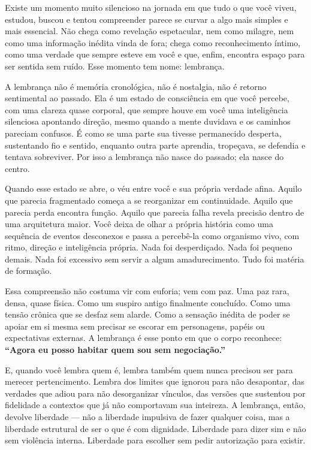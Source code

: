 \documentclass[12pt]{book}
\begin{document}
Existe um momento muito silencioso na jornada em que tudo o que você viveu, estudou, buscou e tentou compreender parece se curvar a algo mais simples e mais essencial. Não chega como revelação espetacular, nem como milagre, nem como uma informação inédita vinda de fora; chega como reconhecimento íntimo, como uma verdade que sempre esteve em você e que, enfim, encontra espaço para ser sentida sem ruído. Esse momento tem nome: lembrança.

A lembrança não é memória cronológica, não é nostalgia, não é retorno sentimental ao passado. Ela é um estado de consciência em que você percebe, com uma clareza quase corporal, que sempre houve em você uma inteligência silenciosa apontando direção, mesmo quando a mente duvidava e os caminhos pareciam confusos. É como se uma parte sua tivesse permanecido desperta, sustentando fio e sentido, enquanto outra parte aprendia, tropeçava, se defendia e tentava sobreviver. Por isso a lembrança não nasce do passado; ela nasce do centro.

Quando esse estado se abre, o véu entre você e sua própria verdade afina. Aquilo que parecia fragmentado começa a se reorganizar em continuidade. Aquilo que parecia perda encontra função. Aquilo que parecia falha revela precisão dentro de uma arquitetura maior. Você deixa de olhar a própria história como uma sequência de eventos desconexos e passa a percebê-la como organismo vivo, com ritmo, direção e inteligência própria. Nada foi desperdiçado. Nada foi pequeno demais. Nada foi excessivo sem servir a algum amadurecimento. Tudo foi matéria de formação.

Essa compreensão não costuma vir com euforia; vem com paz. Uma paz rara, densa, quase física. Como um suspiro antigo finalmente concluído. Como uma tensão crônica que se desfaz sem alarde. Como a sensação inédita de poder se apoiar em si mesma sem precisar se escorar em personagens, papéis ou expectativas externas. A lembrança é esse ponto em que o corpo reconhece: 
\textbf{“Agora eu posso habitar quem sou sem negociação.”}

E, quando você lembra quem é, lembra também quem nunca precisou ser para merecer pertencimento. Lembra dos limites que ignorou para não desapontar, das verdades que adiou para não desorganizar vínculos, das versões que sustentou por fidelidade a contextos que já não comportavam sua inteireza. A lembrança, então, devolve liberdade — não a liberdade impulsiva de fazer qualquer coisa, mas a liberdade estrutural de ser o que é com dignidade. Liberdade para dizer sim e não sem violência interna. Liberdade para escolher sem pedir autorização para existir.
\end{document}
